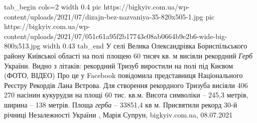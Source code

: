 \ifcmt
  tab_begin cols=2
	width 0.4
     pic https://bigkyiv.com.ua/wp-content/uploads/2021/07/dizajn-bez-nazvaniya-35-820x505-1.jpg
		 pic https://bigkyiv.com.ua/wp-content/uploads/2021/07/051c61a95f2b17743c08ab0664b9e2b6-wide-big-800x513.jpg
	width 0.43
  tab_end
\fi
У селі Велика Олександрівка Бориспільського району Київської області на полі
площею 60 тисяч кв. м висіяли рекордний \emph{Герб} України.  Видно з літаків:
рекордний Тризуб виростили на полі під Києвом (ФОТО, ВІДЕО) Про це у Facebook
повідомила представниця Національного Реєстру Рекордів Лана Вєтрова.  Для
створення рекордного Тризуба висіяли 406 270 насінин кукурудзи на площі 60 тис.
кв.м. Висота символіки – 245,3 метрів, ширина – 138 метрів. Площа \emph{герба}
– 33851,4 кв м.  Присвятили рекорд 30-й річниці Незалежності України
, 
Марія Супрун, bigkyiv.com.ua, 08.07.2021
